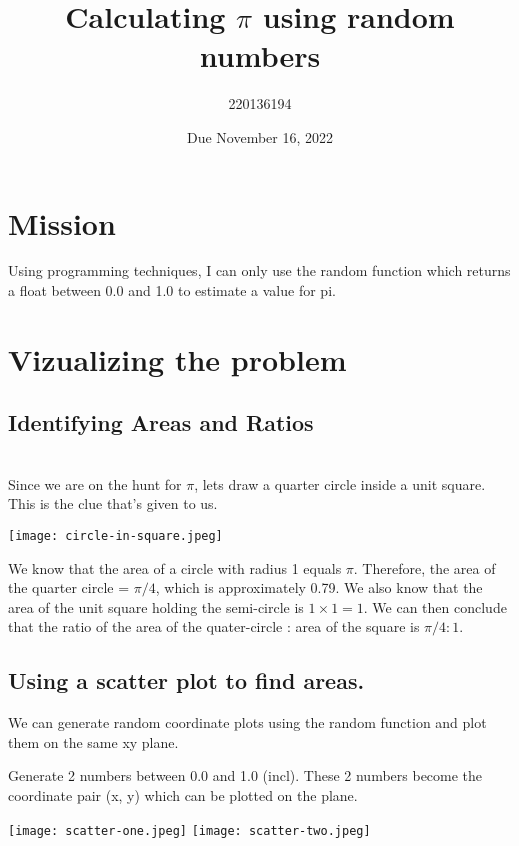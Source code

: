 \documentclass[11pt,a4paper]{amsart}
\title{Calculating $\pi$ using random numbers}
\author{220136194}
\date{Due November 16, 2022}
\begin{document}
\maketitle

\tableofcontents

\section{Mission}

Using programming techniques, I can only use the random function which returns a float between 0.0 and 1.0 to estimate a value for pi.

\section{Vizualizing the problem}

\subsection{Identifying Areas and Ratios} \\

Since we are on the hunt for $\pi$, lets draw a quarter circle inside a unit square. This is the clue that's given to us.

\texttt{[image: circle-in-square.jpeg]}

We know that the area of a circle with radius 1 equals $\pi$.
Therefore, the area of the quarter circle = $\pi/4$, which is approximately 0.79.
We also know that the area of the unit square holding the semi-circle is $1 \times 1 = 1$. 
We can then conclude that the ratio of the area of the quater-circle : area of the square is $\pi / 4 : 1 $.

\subsection{Using a scatter plot to find areas.} 

We can generate random coordinate plots using the random function and plot them on the same xy plane.

\newline Generate 2 numbers between 0.0 and 1.0 (incl). 
\newline These 2 numbers become the coordinate pair (x, y) which can be plotted on the plane.


\texttt{[image: scatter-one.jpeg]}
\texttt{[image: scatter-two.jpeg]}
\end{document}
